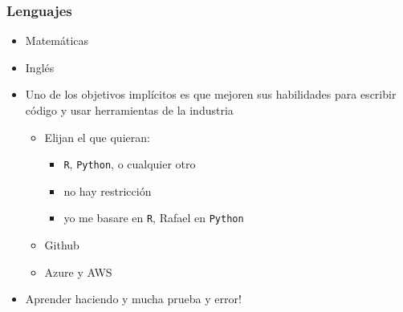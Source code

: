 \documentclass[
  shownotes,
  xcolor={svgnames},
  hyperref={colorlinks,citecolor=DarkBlue,linkcolor=DarkRed,urlcolor=DarkBlue}
  , aspectratio=169]{beamer}
\begin{document}
\begin{frame}
\frametitle{Lenguajes}


\begin{minipage}[t]{0.58\linewidth}
        \begin{itemize}
            \item Matemáticas
            \bigskip
            \item Inglés
            \bigskip
            \item Uno de los objetivos implícitos es que mejoren sus habilidades para escribir código y usar herramientas de la industria
            \begin{itemize}
              \item Elijan el que quieran: 
              \begin{itemize}
                \item \texttt{R}, \texttt{Python}, o cualquier otro
                \item no hay restricción
                \item yo me basare en \texttt{R}, Rafael en \texttt{Python}
                \end{itemize}
              \item Github
              \item Azure y AWS
            \end{itemize}
            \item Aprender haciendo y mucha prueba y error! 
            

\end{itemize}
\end{minipage}
\end{frame}
\end{document}
